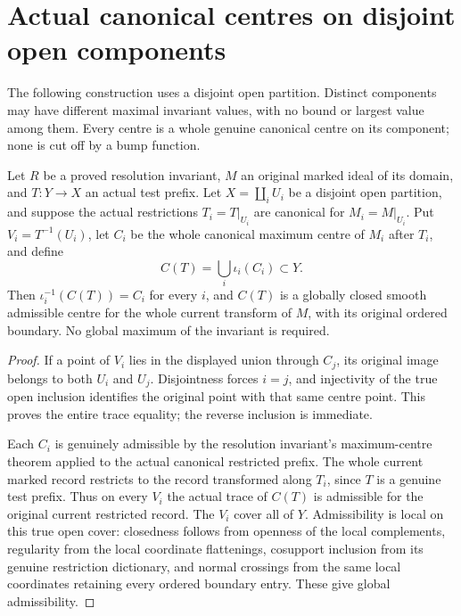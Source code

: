 \section{Actual canonical centres on disjoint open components}
\label{sec:hironaka-componentwise-canonical-centre}

The following construction uses a disjoint open partition. Distinct
components may have different maximal invariant values, with no
bound or largest value among them. Every centre is a whole genuine
canonical centre on its component; none is cut off by a bump function.

\begin{theorem}
\label{hir:componentwise-canonical-centre-exact-trace}
\leanok
Let $R$ be a proved resolution invariant, $M$ an original marked
ideal of its domain, and $T:Y\to X$ an actual test prefix. Let
$X=\coprod_iU_i$ be a disjoint open partition, and suppose the
actual restrictions $T_i=T|_{U_i}$ are canonical for $M_i=M|_{U_i}$.
Put $V_i=T^{-1}(U_i)$, let $C_i$ be the whole canonical maximum
centre of $M_i$ after $T_i$, and define
\[
 C(T)=\bigcup_i\iota_i(C_i)\subset Y.
\]
Then $\iota_i^{-1}(C(T))=C_i$ for every $i$, and $C(T)$ is a
globally closed smooth admissible centre for the whole current
transform of $M$, with its original ordered boundary.
No global maximum of the invariant is required.
\end{theorem}
\begin{proof}
If a point of $V_i$ lies in the displayed union through $C_j$,
its original image belongs to both $U_i$ and $U_j$. Disjointness
forces $i=j$, and injectivity of the true open inclusion identifies
the original point with that same centre point. This proves the
entire trace equality; the reverse inclusion is immediate.

Each $C_i$ is genuinely admissible by the resolution invariant's
maximum-centre theorem applied to the actual canonical restricted
prefix. The whole current marked record restricts to the record
transformed along $T_i$, since $T$ is a genuine test prefix.
Thus on every $V_i$ the actual trace of $C(T)$ is admissible
for the original current restricted record. The $V_i$ cover
all of $Y$. Admissibility is local on this true open cover:
closedness follows from openness of the local complements,
regularity from the local coordinate flattenings, cosupport
inclusion from its genuine restriction dictionary, and normal
crossings from the same local coordinates retaining every
ordered boundary entry. These give global admissibility.
\end{proof}

